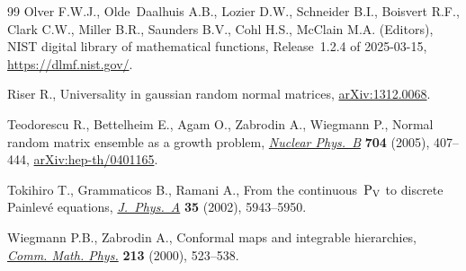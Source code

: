 \documentclass[pdftex]{sigma}
\numberwithin{equation}{section}
\theoremstyle{definition}
\begin{document}
\begin{thebibliography}{99}
Olver F.W.J., Olde~Daalhuis A.B., Lozier D.W., Schneider B.I., Boisvert R.F.,
 Clark C.W., Miller B.R., Saunders B.V., Cohl H.S., McClain M.A. (Editors), {NIST}
 digital library of mathematical functions, {R}elease~1.2.4 of 2025-03-15,
 \url{https://dlmf.nist.gov/}.

Riser R., Universality in gaussian random normal matrices,
 \href{http://arxiv.org/abs/1312.0068}{arXiv:1312.0068}.

Teodorescu R., Bettelheim E., Agam O., Zabrodin A., Wiegmann P., Normal random
 matrix ensemble as a growth problem,
 \href{https://doi.org/10.1016/j.nuclphysb.2004.10.006}{\textit{Nuclear
 Phys.~B}} \textbf{704} (2005), 407--444,
 \href{http://arxiv.org/abs/hep-th/0401165}{arXiv:hep-th/0401165}.

Tokihiro T., Grammaticos B., Ramani A., From the continuous~{$\rm P_V$} to
 discrete {P}ainlev\'e equations,
 \href{https://doi.org/10.1088/0305-4470/35/28/312}{\textit{J.~Phys.~A}}
 \textbf{35} (2002), 5943--5950.

Wiegmann P.B., Zabrodin A., Conformal maps and integrable hierarchies,
 \href{https://doi.org/10.1007/s002200000249}{\textit{Comm. Math. Phys.}}
 \textbf{213} (2000), 523--538.

\end{thebibliography}\LastPageEnding
\end{document}
